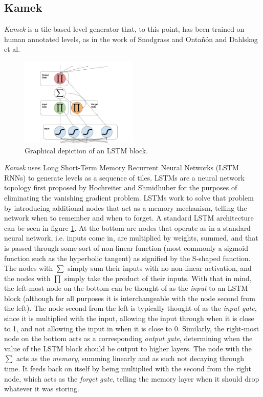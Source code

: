 \documentclass[12pt]{report}
\begin{document}
\subsection*{Kamek}



\textit{Kamek} is a tile-based level generator that, to this point, has been trained on human annotated levels, as in the work of Snodgrass and Onta{\~n}{\'o}n and Dahlskog et al.  

\begin{figure}[ht]
\centering
    \includegraphics[width=0.5\textwidth]{figures/LSTM_Cell.png}
    \caption{Graphical depiction of an LSTM block. }
    \label{fig:LSTM}
\end{figure}

\textit{Kamek} uses Long Short-Term Memory Recurrent Neural Networks (LSTM RNNs) to generate levels as a sequence of tiles.
LSTMs are a neural network topology first proposed by Hochreiter  and Shmidhuber \cite{LSTM} for the purposes of eliminating the vanishing gradient problem.  LSTMs work to solve that problem by introducing additional nodes that act as a memory mechanism, telling the network when to remember and when to forget.  A standard LSTM architecture can be seen in figure \ref{fig:LSTM}.  At the bottom
are nodes that operate as in a standard neural network, i.e. inputs come in, are multiplied by weights, summed, and that is passed through some sort of non-linear function (most commonly a sigmoid function such as the hyperbolic tangent) as signified by the S-shaped function.  The nodes with $\sum$ simply sum their inputs with no non-linear activation, and the nodes with $\prod$ simply take the product of their inputs.  With that in mind, the left-most node on the bottom can be thought of as the \textit{input} to an LSTM block (although for all purposes it is interchangeable with the node second from the left).  The node second from the left is typically thought of as the \textit{input gate}, since it is multiplied with the input, allowing the input through when it is close to 1, and not allowing the input in when it is close to 0.  Similarly, the right-most node on the bottom acts as a corresponding \textit{output gate}, determining when the value of the LSTM block should be output to higher layers.  The node with the $\sum$ acts as the \textit{memory}, summing linearly and as such not decaying through time.  It feeds back on itself by being multiplied with the second from the right node, which acts as the \textit{forget gate}, telling the memory layer when it should drop whatever it was storing. 
\end{document}
